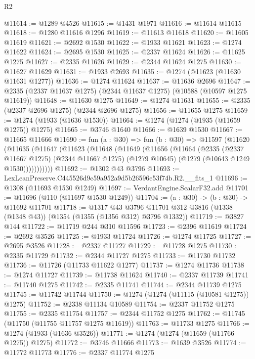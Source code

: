 \begin{lexlean}{R2}
\begin{coremodule}
@11614 := @1289 @4526
@11615 := @1431 @1971
@11616 := @11614 @11615
@11618 := @1280 @11616 @1296
@11619 := @11613 @11618
@11620 := @11605 @11619
@11621 := @2692 @1530
@11622 := @1933 @11621
@11623 := @1274 @11622
@11624 := @2695 @1530
@11625 := @2337 @11624
@11626 := @11625 @1275
@11627 := @2335 @11626
@11629 := @2344 @11624 @1275
@11630 := @11627 @11629
@11631 := @1933 @2693
@11635 := @1274 (@11623 (@11630 @11631 @1277))
@11636 := @1274 @11624
@11637 := @11636 @2696
@11647 := @2335 (@2337 @11637 @1275) (@2344 @11637 @1275) (@10588 (@10597 @1275 @11619))
@11648 := @11630 @1275
@11649 := @1274 @11631
@11655 := @2335 (@2337 @2696 @1275) (@2344 @2696 @1275)
@11656 := @11655 @1275
@11659 := @1274 (@1933 (@1636 @1530))
@11664 := @1274 (@1274 (@1935 (@11659 @1275)) @1275)
@11665 := @3746 @1640
@11666 := @1639 @1530
@11667 := @11665 @11666
@11690 := fun (a : @30) =>
  fun (b : @30) =>
  @11597
    (@11620
      (@11635
        (@11647
          (@11623
            (@11648
              (@11649
                (@11656
                  (@11664
                    (@2335
                      (@2337 @11667 @1275)
                      (@2344 @11667 @1275)
                      (@1279 @10645)
                      (@1279 (@10643 @1249 @1530)))))))))))
@11692 := @1302 @43 @3796
@11693 := LexLeanPreserve.C445526d9c59a952a9d5b26596e53f74b.R2.__fits_1
@11696 := @1308 (@11693 @1530 @1249)
@11697 := VerdantEngine.ScalarF32.add
@11701 := @11696 (@110 (@11697 @1530 @1249))
@11704 := (a : @30) -> (b : @30) -> @11692 @11701
@11718 := @1317
    @43
    @3796
    @11701
    @312
    @3816
    (@1338 (@1348 @43))
    (@1354 (@1355 (@1356 @312) @3796 @1332))
@11719 := @3827 @144
@11722 := @11719 @244 @310 @11596
@11723 := @2396 @11619
@11724 := @2692 @3526
@11725 := @1933 @11724
@11726 := @1274 @11725
@11727 := @2695 @3526
@11728 := @2337 @11727
@11729 := @11728 @1275
@11730 := @2335 @11729
@11732 := @2344 @11727 @1275
@11733 := @11730 @11732
@11736 := @11726 (@11733 @11622 @1277)
@11737 := @1274 @11736
@11738 := @1274 @11727
@11739 := @11738 @11624
@11740 := @2337 @11739
@11741 := @11740 @1275
@11742 := @2335 @11741
@11744 := @2344 @11739 @1275
@11745 := @11742 @11744
@11750 := @1274 (@1274 (@11115 (@10581 @1275)) @1275)
@11752 := @2338 @11134 @10589
@11754 := @2337 @11752 @1275
@11755 := @2335 @11754
@11757 := @2344 @11752 @1275
@11762 := @11745 (@11750 (@11755 @11757 @1275 @11619))
@11763 := @11733 @1275
@11766 := @1274 (@1933 (@1636 @3526))
@11771 := @1274 (@1274 (@11659 (@11766 @1275)) @1275)
@11772 := @3746 @11666
@11773 := @1639 @3526
@11774 := @11772 @11773
@11776 := @2337 @11774 @1275

\end{coremodule}
\end{lexlean}
